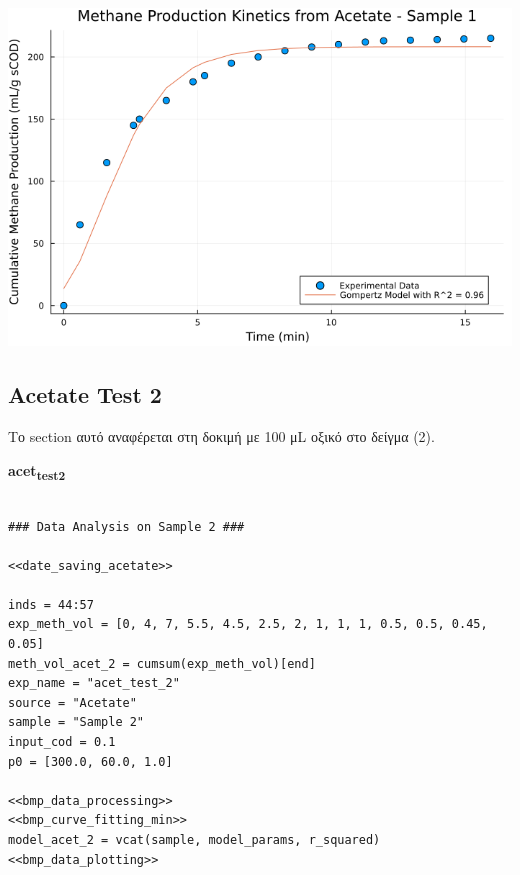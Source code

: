 \documentclass[11pt]{article}
\begin{document}
\begin{center}
\includegraphics[width=.9\linewidth]{../plots/BMPs/Acetate/methane_kinetics_acet_test_1.png}
\end{center}

\subsection{Acetate Test 2}
\label{sec:org1ea860f}
Το section αυτό αναφέρεται στη δοκιμή με 100 μL οξικό στο δείγμα (2).

\textbf{acet\textsubscript{test}\textsubscript{2}}
\begin{verbatim}

### Data Analysis on Sample 2 ###

<<date_saving_acetate>>

inds = 44:57
exp_meth_vol = [0, 4, 7, 5.5, 4.5, 2.5, 2, 1, 1, 1, 0.5, 0.5, 0.45, 0.05]
meth_vol_acet_2 = cumsum(exp_meth_vol)[end]
exp_name = "acet_test_2"
source = "Acetate"
sample = "Sample 2"
input_cod = 0.1
p0 = [300.0, 60.0, 1.0]

<<bmp_data_processing>>
<<bmp_curve_fitting_min>>
model_acet_2 = vcat(sample, model_params, r_squared)
<<bmp_data_plotting>>
\end{verbatim}
\end{document}
